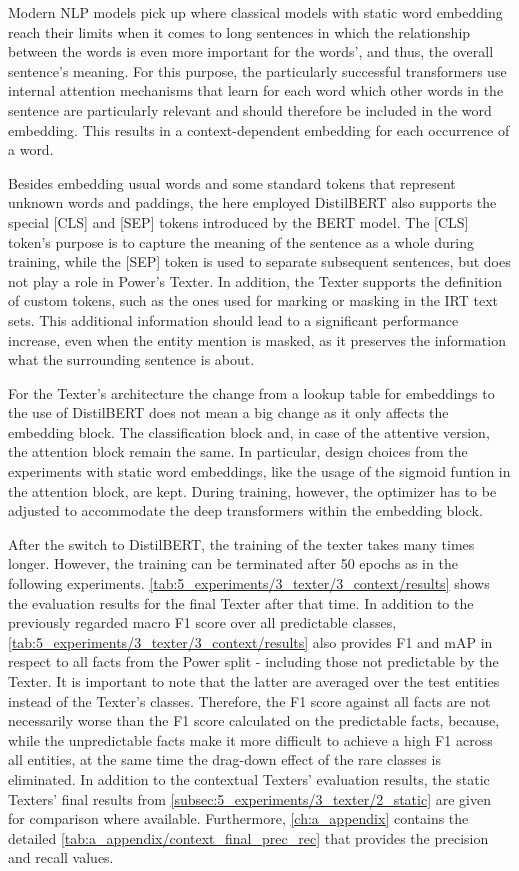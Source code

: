 Modern NLP models pick up where classical models with static word embedding reach their limits when it comes to long sentences in which the relationship between the words is even more important for the words', and thus, the overall sentence's meaning. For this purpose, the particularly successful transformers use internal attention mechanisms that learn for each word which other words in the sentence are particularly relevant and should therefore be included in the word embedding. This results in a context-dependent embedding for each occurrence of a word.

Besides embedding usual words and some standard tokens that represent unknown words and paddings, the here employed DistilBERT also supports the special [CLS] and [SEP] tokens introduced by the BERT model. The [CLS] token's purpose is to capture the meaning of the sentence as a whole during training, while the [SEP] token is used to separate subsequent sentences, but does not play a role in Power's Texter. In addition, the Texter supports the definition of custom tokens, such as the ones used for marking or masking in the IRT text sets. This additional information should lead to a significant performance increase, even when the entity mention is masked, as it preserves the information what the surrounding sentence is about.

For the Texter's architecture the change from a lookup table for embeddings to the use of DistilBERT does not mean a big change as it only affects the embedding block. The classification block and, in  case of the attentive version, the attention block remain the same. In particular, design choices from the experiments with static word embeddings, like the usage of the sigmoid funtion in the attention block, are kept. During training, however, the optimizer has to be adjusted to accommodate the deep transformers within the embedding block.

After the switch to DistilBERT, the training of the texter takes many times longer. However, the training can be terminated after 50 epochs as in the following experiments. \autoref{tab:5_experiments/3_texter/3_context/results} shows the evaluation results for the final Texter after that time. In addition to the previously regarded macro F1 score over all predictable classes, \autoref{tab:5_experiments/3_texter/3_context/results} also provides F1 and mAP in respect to all facts from the Power split - including those not predictable by the Texter. It is important to note that the latter are averaged over the test entities instead of the Texter's classes. Therefore, the F1 score against all facts are not necessarily worse than the F1 score calculated on the predictable facts, because, while the unpredictable facts make it more difficult to achieve a high F1 across all entities, at the same time the drag-down effect of the rare classes is eliminated. In addition to the contextual Texters' evaluation results, the static Texters' final results from \autoref{subsec:5_experiments/3_texter/2_static} are given for comparison where available. Furthermore, \autoref{ch:a_appendix} contains the detailed \autoref{tab:a_appendix/context_final_prec_rec} that provides the precision and recall values.

